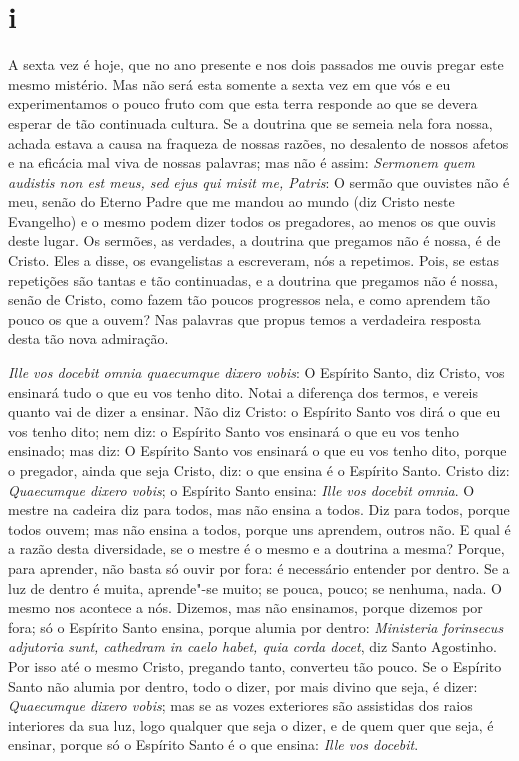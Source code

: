 \section{i}

\noindent{}A sexta vez é hoje, que no ano presente e nos dois passados me ouvis
pregar este mesmo mistério. Mas não será esta somente a sexta vez em que
vós e eu experimentamos o pouco fruto com que esta terra responde ao que
se devera esperar de tão continuada cultura. Se a doutrina que se semeia
nela fora nossa, achada estava a causa na fraqueza de nossas razões, no
desalento de nossos afetos e na eficácia mal viva de nossas palavras;
mas não é assim: \emph{Sermonem quem audistis non est meus, sed ejus qui
misit me, Patris}: O sermão que ouvistes não é meu, senão %
do Eterno Padre que me mandou ao mundo (diz Cristo neste Evangelho)
e o mesmo podem dizer todos os pregadores, ao menos os que ouvis
deste lugar. Os sermões, as verdades, a doutrina que pregamos não é
nossa, é de Cristo. Eles a disse, os evangelistas a escreveram, nós a
repetimos. Pois, se estas repetições são tantas e tão continuadas, e a
doutrina que pregamos não é nossa, senão de Cristo, como fazem tão
poucos progressos nela, e como aprendem tão pouco os que a ouvem? Nas
palavras que propus temos a verdadeira resposta desta tão nova
admiração.

\emph{Ille vos docebit omnia quaecumque dixero vobis}: O Espírito Santo,
diz Cristo, vos ensinará tudo o que eu vos tenho dito. Notai
a diferença dos termos, e vereis quanto vai de dizer a ensinar. Não diz
Cristo: o Espírito Santo vos dirá o que eu vos tenho dito; nem diz: o
Espírito Santo vos ensinará o que eu vos tenho ensinado; mas diz: O
Espírito Santo vos ensinará o que eu vos tenho dito, porque o pregador,
ainda que seja Cristo, diz: o que ensina é o Espírito Santo. Cristo diz:
\emph{Quaecumque dixero vobis}; o Espírito Santo ensina: \emph{Ille vos
docebit omnia}. O mestre na cadeira diz para todos, mas não ensina a
todos. Diz para todos, porque todos ouvem; mas não ensina a todos,
porque uns aprendem, outros não. E qual é a razão desta diversidade, se
o mestre é o mesmo e a doutrina a mesma? Porque, para aprender, não
basta só ouvir por fora: é necessário entender por dentro. Se a luz de
dentro é muita, aprende"-se muito; se pouca, pouco; se nenhuma, nada. O
mesmo nos acontece a nós. Dizemos, mas não ensinamos, porque dizemos por
fora; só o Espírito Santo ensina, porque alumia por dentro:
\emph{Ministeria forinsecus adjutoria sunt, cathedram in caelo habet,
quia corda docet}, diz Santo Agostinho. Por isso até o mesmo Cristo,
pregando tanto, converteu tão pouco. Se o Espírito Santo não alumia por
dentro, todo o dizer, por mais divino que seja, é dizer:
\emph{Quaecumque dixero vobis}; mas se as vozes exteriores são
assistidas dos raios interiores da sua luz, logo qualquer que seja o
dizer, e de quem quer que seja, é ensinar, porque só o Espírito Santo é
o que ensina: \emph{Ille vos docebit}.

